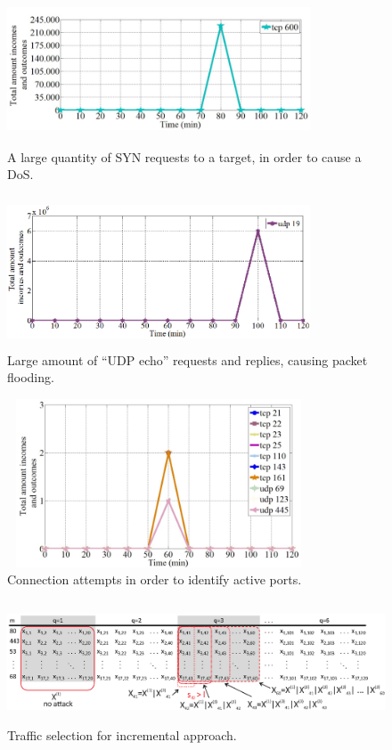\documentclass{bmcart}
\begin{document}
\begin{backmatter}
\begin{figure}[h!]
     \centering 
     \includegraphics[height=4.5cm, width=9cm]{results/figures/fig05.png}
     \caption{ A large quantity of SYN requests to a target, in order to cause a DoS.}
     \label{fig:fig5}
\end{figure}

\begin{figure}[h!]
     \centering 
     \includegraphics[height=4.5cm, width=9cm]{results/figures/fig06.png}
     \caption{ Large amount of “UDP echo” requests and replies, causing packet flooding.}
     \label{fig:fig6}
\end{figure}

\begin{figure}[h!]
     \centering 
     \includegraphics[height=5cm, width=9cm]{results/figures/fig07.png}
     \caption{ Connection attempts in order to identify active ports.}
     \label{fig:fig7}
\end{figure}

\begin{figure}[h!]
     \includegraphics[height=3.6cm, width=12.4cm]{results/figures/incremental.eps}
     \caption{ Traffic selection for incremental approach.}
     \label{fig:fig8}
\end{figure}


\end{backmatter}
\end{document}
